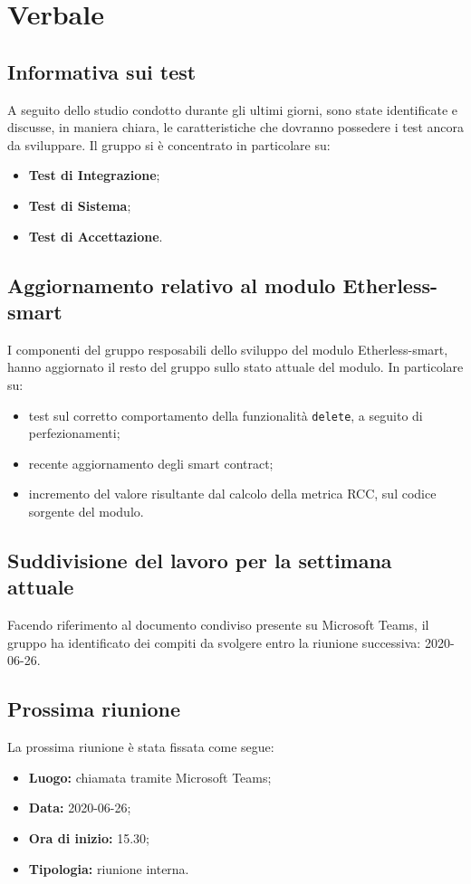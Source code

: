 \section{Verbale}
	\subsection{Informativa sui test}
		A seguito dello studio condotto durante gli ultimi giorni, sono state identificate e discusse, in maniera chiara, le caratteristiche che dovranno possedere i test ancora da sviluppare. Il gruppo si è concentrato in particolare su:
		\begin{itemize}
			\item \textbf{Test di Integrazione};
			\item \textbf{Test di Sistema};
			\item \textbf{Test di Accettazione}.
		\end{itemize}
		
	\subsection{Aggiornamento relativo al modulo Etherless-smart}
		I componenti del gruppo resposabili dello sviluppo del modulo Etherless-smart, hanno aggiornato il resto del gruppo sullo stato attuale del modulo. In particolare su:
		\begin{itemize}
			\item test sul corretto comportamento della funzionalità \texttt{delete}, a seguito di perfezionamenti;
			\item recente aggiornamento degli smart contract;
			\item incremento del valore risultante dal calcolo della metrica RCC, sul codice sorgente del modulo.
		\end{itemize}
		
	\subsection{Suddivisione del lavoro per la settimana attuale}
		Facendo riferimento al documento condiviso presente su Microsoft Teams, il gruppo ha identificato dei compiti da svolgere entro la riunione successiva: 2020-06-26.
				
	\subsection{Prossima riunione}
		La prossima riunione è stata fissata come segue:
		\begin{itemize}
			\item \textbf{Luogo:} chiamata tramite Microsoft Teams; 
			\item \textbf{Data:} 2020-06-26;
			\item \textbf{Ora di inizio:} 15.30;
			\item \textbf{Tipologia:} riunione interna.
		\end{itemize}